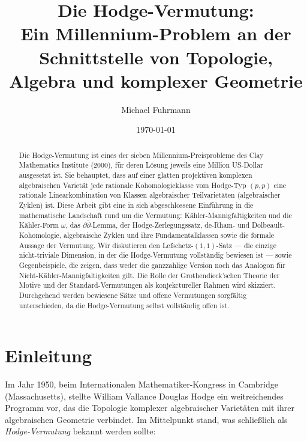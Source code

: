 \documentclass[12pt,a4paper]{amsart}
\theoremstyle{definition}
\theoremstyle{remark}
\begin{document}
\title{Die Hodge-Vermutung:\\
Ein Millennium-Problem an der Schnittstelle von Topologie, Algebra und komplexer Geometrie}

\author{Michael Fuhrmann}
\address{Specialist Mathematics Project, Build 147}
\date{\today}

\begin{abstract}
Die Hodge-Vermutung ist eines der sieben Millennium-Preisprobleme des Clay Mathematics
Institute (2000), für deren Lösung jeweils eine Million US-Dollar ausgesetzt ist.
Sie behauptet, dass auf einer glatten projektiven komplexen algebraischen Varietät
jede rationale Kohomologieklasse vom Hodge-Typ $(p,p)$ eine rationale Linearkombination
von Klassen algebraischer Teilvarietäten (algebraischer Zyklen) ist. Diese Arbeit
gibt eine in sich abgeschlossene Einführung in die mathematische Landschaft rund um
die Vermutung: Kähler-Mannigfaltigkeiten und die Kähler-Form $\omega$, das
$\partial\bar\partial$-Lemma, der Hodge-Zerlegungssatz, de-Rham- und Dolbeault-Kohomologie,
algebraische Zyklen und ihre Fundamentalklassen sowie die formale Aussage der Vermutung.
Wir diskutieren den Lefschetz-$(1,1)$-Satz — die einzige nicht-triviale Dimension,
in der die Hodge-Vermutung vollständig bewiesen ist — sowie Gegenbeispiele, die zeigen,
dass weder die ganzzahlige Version noch das Analogon für Nicht-Kähler-Mannigfaltigkeiten
gilt. Die Rolle der Grothendieck'schen Theorie der Motive und der Standard-Vermutungen
als konjekctureller Rahmen wird skizziert. Durchgehend werden bewiesene Sätze und
offene Vermutungen sorgfältig unterschieden, da die Hodge-Vermutung selbst vollständig
offen ist.
\end{abstract}

\maketitle

\tableofcontents

\section{Einleitung}
\label{sec:einleitung}

Im Jahr 1950, beim Internationalen Mathematiker-Kongress in Cambridge (Massachusetts),
stellte William Vallance Douglas Hodge ein weitreichendes Programm vor, das die
Topologie komplexer algebraischer Varietäten mit ihrer algebraischen Geometrie
verbindet. Im Mittelpunkt stand, was schließlich als \emph{Hodge-Vermutung} bekannt
werden sollte:
\end{document}
